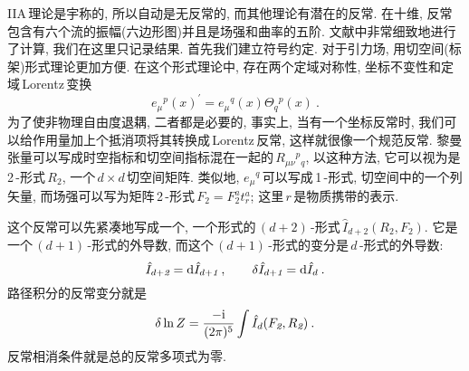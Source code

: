 IIA\,理论是宇称的, 所以自动是无反常的, 而其他理论有潜在的反常. 在十维, 反常包含有六个流的振幅(六边形图)并且是场强和曲率的五阶. 文献中非常细致地进行了计算, 我们在这里只记录结果. 首先我们建立符号约定. 对于引力场, 用切空间(标架)形式理论更加方便. 在这个形式理论中, 存在两个定域对称性, 坐标不变性和定域\,Lorentz\,变换
\begin{equation}
    e_{\mu}{}^{p}(x)^{\prime}=e_{\mu}{}^{q}(x)\Theta_{q}{}^{p}(x)\:. \label{12.2.8}
\end{equation}
为了使非物理自由度退耦, 二者都是必要的, 事实上, 当有一个坐标反常时, 我们可以给作用量加上个抵消项将其转换成\,Lorentz\,反常, 这样就很像一个规范反常. 黎曼张量可以写成时空指标和切空间指标混在一起的$\,R_{\mu\nu}{}^{p}{}_{q}$, 以这种方法, 它可以视为是\,2\,-形式$\,R_{\textit{2}}$, 一个$\,d\times d\,$切空间矩阵. 类似地, $e_{\mu}{}^{q}\,$可以写成\,1\,-形式, 切空间中的一个列矢量, 而场强可以写为矩阵\,2\,-形式$\,F_{\textit{2}}=F_{\textit{2}}^{a}t_{r}^{a}$; 这里$\,r\,$是物质携带的表示.

这个反常可以先紧凑地写成一个{}, 一个形式的$\,(d+2)\,$-形式$\,\hat{I}_{d+2}(R_{\textit{2}},F_{\textit{2}})$. 它是一个$\,(d+1)\,$-形式的外导数, 而这个$\,(d+1)\,$-形式的变分是$\,d\,$-形式的外导数:
\begin{equation}
    \hat{I}_{d+\textit{2}} = \mathrm{d} \hat{I}_{d+\textit{1}} \:, \qquad 
    \delta\hat{I}_{d+\textit{1}} =\mathrm{d} \hat{I}_{d} \:. \label{12.2.9}
\end{equation}
路径积分的反常变分就是
\begin{equation}
    \delta \ln Z =\frac{-\mathrm{i}}{(2\pi)^{5}} \int \hat{I}_{d}(F_{\textit{2}},R_{\textit{2}}) \:. \label{12.2.10}
\end{equation}
反常相消条件就是总的反常多项式为零.

